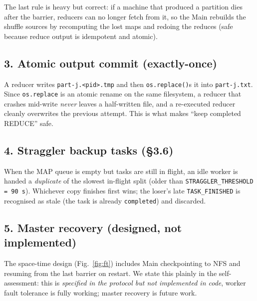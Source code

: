 \documentclass[11pt,a4paper]{article}
\newcommand{\code}[1]{\texttt{\small #1}}
\begin{document}
The last rule is heavy but correct: if a machine that produced a partition dies
after the barrier, reducers can no longer fetch from it, so the Main rebuilds the
shuffle sources by recomputing the lost maps and redoing the reduces (safe
because reduce output is idempotent and atomic).

\subsection{3. Atomic output commit (exactly-once)}

A reducer writes \code{part-j.<pid>.tmp} and then \code{os.replace()}s it into
\code{part-j.txt}. Since \code{os.replace} is an atomic rename on the same
filesystem, a reducer that crashes mid-write \emph{never} leaves a half-written
file, and a re-executed reducer cleanly overwrites the previous attempt. This is
what makes ``keep completed REDUCE'' safe.

\subsection{4. Straggler backup tasks (\S3.6)}

When the MAP queue is empty but tasks are still in flight, an idle worker is
handed a \emph{duplicate} of the slowest in-flight split (older than
\code{STRAGGLER\_THRESHOLD = 90\,s}). Whichever copy finishes first wins; the
loser's late \code{TASK\_FINISHED} is recognised as stale (the task is already
\code{completed}) and discarded.

\subsection{5. Master recovery (designed, not implemented)}

The space-time design (Fig.~\ref{fig:ft}) includes Main checkpointing to NFS and
resuming from the last barrier on restart. We state this plainly in the self-assessment:
this is \emph{specified in the protocol but not implemented in code}, worker
fault tolerance is fully working; master recovery is future work.
\end{document}

